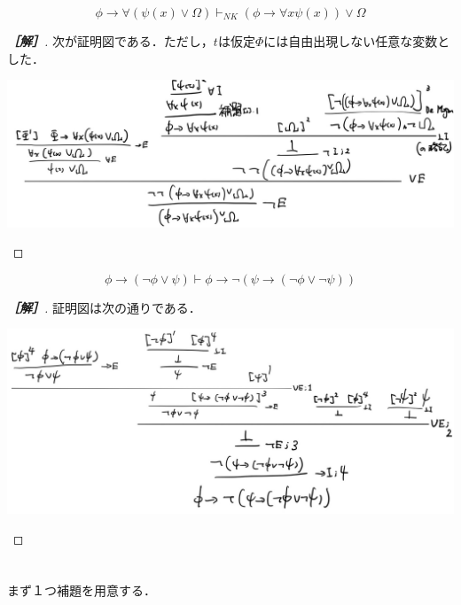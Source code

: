 \documentclass[uplatex,dvipdfmx]{jsarticle}
\begin{document}
\begin{problem}[2007年度版(3)]
    \[\phi\to\forall(\psi(x)\lor\Omega)\vdash_{NK}(\phi\to\forall x\psi(x))\lor\Omega\]
\end{problem}
\begin{proof}[\bf{［解］}]
    次が証明図である．ただし，$t$は仮定$\Phi$には自由出現しない任意な変数とした．
    \begin{center}
        \includegraphics[width=15cm]{figure5.jpg}
    \end{center}
\end{proof}

\begin{problem}[2008年度版(1)]
    \[\phi\to(\lnot\phi\lor\psi)\vdash\phi\to\lnot(\psi\to(\lnot\phi\lor\lnot\psi))\]
\end{problem}
\begin{proof}[\bf{［解］}]
    証明図は次の通りである．
    \begin{center}
        \includegraphics[width=15cm]{figure6.jpg}
    \end{center}
\end{proof}

\section{}

まず１つ補題を用意する．
\end{document}
